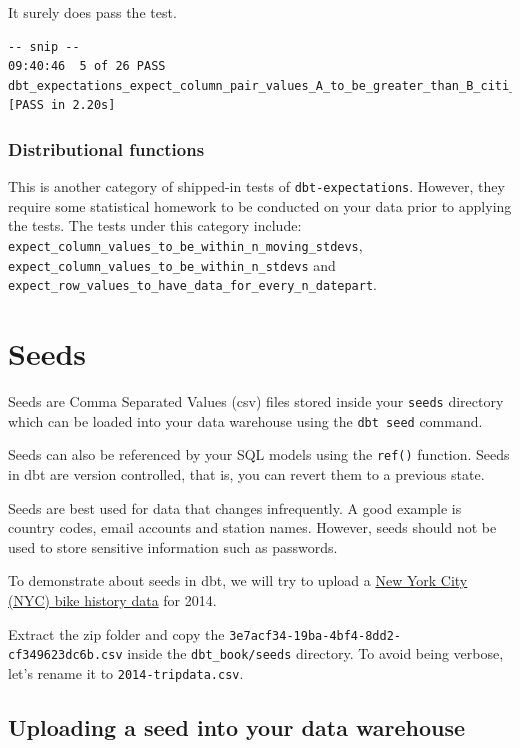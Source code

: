 \documentclass[
]{book}
\begin{document}
It surely does pass the test.

\begin{verbatim}
-- snip --
09:40:46  5 of 26 PASS dbt_expectations_expect_column_pair_values_A_to_be_greater_than_B_citi_trips_round_tripduration__trip_min_round  [PASS in 2.20s]
\end{verbatim}

\hypertarget{distributional-functions}{%
\subsection{Distributional functions}\label{distributional-functions}}

This is another category of shipped-in tests of \texttt{dbt-expectations}. However, they require some statistical homework to be conducted on your data prior to applying the tests. The tests under this category include: \texttt{expect\_column\_values\_to\_be\_within\_n\_moving\_stdevs}, \texttt{expect\_column\_values\_to\_be\_within\_n\_stdevs} and \texttt{expect\_row\_values\_to\_have\_data\_for\_every\_n\_datepart}.

\hypertarget{seeds}{%
\chapter{Seeds}\label{seeds}}

Seeds are Comma Separated Values (csv) files stored inside your \texttt{seeds} directory which can be loaded into your data warehouse using the \texttt{dbt\ seed} command.

Seeds can also be referenced by your SQL models using the \texttt{ref()} function. Seeds in dbt are version controlled, that is, you can revert them to a previous state.

Seeds are best used for data that changes infrequently. A good example is country codes, email accounts and station names. However, seeds should not be used to store sensitive information such as passwords.

To demonstrate about seeds in dbt, we will try to upload a \href{https://www.civicdata.com/dataset/nyc-bike-share-trip-data/resource/3e7acf34-19ba-4bf4-8dd2-cf349623dc6b}{New York City (NYC) bike history data} for 2014.

Extract the zip folder and copy the \texttt{3e7acf34-19ba-4bf4-8dd2-cf349623dc6b.csv} inside the \texttt{dbt\_book/seeds} directory. To avoid being verbose, let's rename it to \texttt{2014-tripdata.csv}.

\hypertarget{uploading-a-seed-into-your-data-warehouse}{%
\section{Uploading a seed into your data warehouse}\label{uploading-a-seed-into-your-data-warehouse}}
\end{document}

